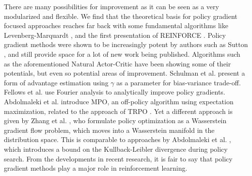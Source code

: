 There are many possibilities for improvement as it can be seen as a very modularized and flexible. 
We find that the theoretical basis for policy gradient focused approaches reaches far back with some fundamental algorithms like Levenberg-Marquardt \cite{levenbergmarquardt1978}, and the first presentation of REINFORCE \cite{Williams92simplestatistical}. 
Policy gradient methods were shown to be increasingly potent by authors such as Sutton \cite{Sutton:1999:PGM:3009657.3009806}, and still provide space for a lot of new work being published. 
Algorithms such as the aforementioned Natural Actor-Critic \cite{4863} have been showing some of their potentials, but even so potential areas of improvement. 
Schulman et al. \cite{DBLP:journals/corr/SchulmanMLJA15} present a form of advantage estimation using $\gamma$ as a parameter for bias-variance trade-off. 
Fellows et al. \cite{fellows:icml18} use Fourier analysis to analytically improve policy gradients. 
Abdolmaleki et al. \cite{abdolmaleki2018maximum} introduce MPO, an off-policy algorithm using expectation maximization, related to the approach of TRPO \cite{pmlr-v37-schulman15}. 
Yet a different approach is given by Zhang et al. \cite{DBLP:journals/corr/abs-1808-03030}, who formulate policy optimization as a Wasserstein gradient flow problem, which moves into a Wasserstein manifold in the distribution space. 
This is comparable to approaches by Abdolmaleki et al. \cite{NIPS2015_5672}, which introduces a bound on the Kullback-Leibler divergence during policy search. 
From the developments in recent research, it is fair to say that policy gradient methods play a major role in reinforcement learning. 





